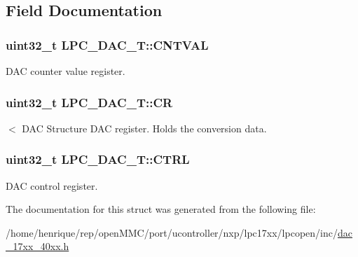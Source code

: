 \subsection{Field Documentation}
\hypertarget{structLPC__DAC__T_adfd515a77f5d9e0e7ca6b6835a996c47}{
\subsubsection[{C\-N\-T\-V\-A\-L}]{ uint32\-\_\-t L\-P\-C\-\_\-\-D\-A\-C\-\_\-\-T\-::\-C\-N\-T\-V\-A\-L}}\label{structLPC__DAC__T_adfd515a77f5d9e0e7ca6b6835a996c47}
D\-A\-C counter value register. \hypertarget{structLPC__DAC__T_a9e9bbab757da4f3ef793da168224eb9d}{
\subsubsection[{C\-R}]{ uint32\-\_\-t L\-P\-C\-\_\-\-D\-A\-C\-\_\-\-T\-::\-C\-R}}\label{structLPC__DAC__T_a9e9bbab757da4f3ef793da168224eb9d}
$<$ D\-A\-C Structure D\-A\-C register. Holds the conversion data. \hypertarget{structLPC__DAC__T_a602c1a7a50c8372683c0eef978e2c149}{
\subsubsection[{C\-T\-R\-L}]{ uint32\-\_\-t L\-P\-C\-\_\-\-D\-A\-C\-\_\-\-T\-::\-C\-T\-R\-L}}\label{structLPC__DAC__T_a602c1a7a50c8372683c0eef978e2c149}
D\-A\-C control register. 

The documentation for this struct was generated from the following file\-:\begin{DoxyCompactItemize}
\item 
/home/henrique/rep/open\-M\-M\-C/port/ucontroller/nxp/lpc17xx/lpcopen/inc/\hyperlink{dac__17xx__40xx_8h}{dac\-\_\-17xx\-\_\-40xx.\-h}\end{DoxyCompactItemize}
